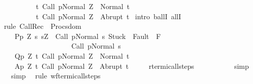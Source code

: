 \begin{isabellebody}
\ \ \ \ \ \ \ \ \ \ {\isacharbraceleft}t{\isachardot}\ {\isasymGamma}{\isasymturnstile}{\isasymlangle}Call\ p{\isacharcomma}Normal\ Z{\isasymrangle}\ {\isasymRightarrow}\ Normal\ t{\isacharbraceright}{\isacharcomma}\isanewline
\ \ \ \ \ \ \ \ \ \ {\isacharbraceleft}t{\isachardot}\ {\isasymGamma}{\isasymturnstile}{\isasymlangle}Call\ p{\isacharcomma}Normal\ Z{\isasymrangle}\ {\isasymRightarrow}\ Abrupt\ t{\isacharbraceright}{\isachardoublequoteclose}\isanewline
%
\isadelimproof
%
\endisadelimproof
%
\isatagproof
{}\isamarkupfalse%
\ {\isacharparenleft}intro\ ballI\ allI{\isacharparenright}\isanewline
{}\isamarkupfalse%
\ {\isacharparenleft}rule\ CallRec{\isacharprime}\ {\isacharbrackleft}\ Procs{\isacharequal}{\isachardoublequoteopen}dom\ {\isasymGamma}{\isachardoublequoteclose}\ \isanewline
\ \ \ \ P{\isacharequal}{\isachardoublequoteopen}{\isasymlambda}p\ Z{\isachardot}\ {\isacharbraceleft}s{\isachardot}\ s{\isacharequal}Z\ {\isasymand}\ {\isasymGamma}{\isasymturnstile}{\isasymlangle}Call\ p{\isacharcomma}Normal\ s{\isasymrangle}\ {\isasymRightarrow}{\isasymnotin}{\isacharparenleft}{\isacharbraceleft}Stuck{\isacharbraceright}\ {\isasymunion}\ Fault\ {\isacharbackquote}\ {\isacharparenleft}{\isacharminus}F{\isacharparenright}{\isacharparenright}\ {\isasymand}\ \isanewline
\ \ \ \ \ \ \ \ \ \ \ \ \ \ \ \ \ \ \ \ {\isasymGamma}{\isasymturnstile}Call\ p{\isasymdown}Normal\ s{\isacharbraceright}{\isachardoublequoteclose}\ \isanewline
\ \ \ \ Q{\isacharequal}{\isachardoublequoteopen}{\isasymlambda}p\ Z{\isachardot}\ {\isacharbraceleft}t{\isachardot}\ {\isasymGamma}{\isasymturnstile}{\isasymlangle}Call\ p{\isacharcomma}Normal\ Z{\isasymrangle}\ {\isasymRightarrow}\ Normal\ t{\isacharbraceright}{\isachardoublequoteclose}\ \isanewline
\ \ \ \ A{\isacharequal}{\isachardoublequoteopen}{\isasymlambda}p\ Z{\isachardot}\ {\isacharbraceleft}t{\isachardot}\ {\isasymGamma}{\isasymturnstile}{\isasymlangle}Call\ p{\isacharcomma}Normal\ Z{\isasymrangle}\ {\isasymRightarrow}\ Abrupt\ t{\isacharbraceright}{\isachardoublequoteclose}\ \isanewline
\ \ \ \ r{\isacharequal}{\isachardoublequoteopen}termi{\isacharunderscore}call{\isacharunderscore}steps\ {\isasymGamma}{\isachardoublequoteclose}\isanewline
\ \ \ \ {\isacharbrackright}{\isacharparenright}\ \isanewline
{}\isamarkupfalse%
\ \ \ \ simp\isanewline
{}\isamarkupfalse%
\ \ \ simp\isanewline
{}\isamarkupfalse%
\ \ {\isacharparenleft}rule\ wf{\isacharunderscore}termi{\isacharunderscore}call{\isacharunderscore}steps{\isacharparenright}\isanewline

\end{isabellebody}
